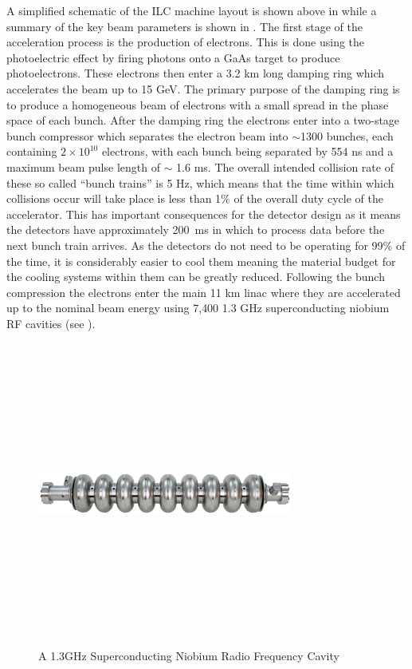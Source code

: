 A simplified schematic of the \ac{ILC} machine layout is shown above in  while a summary of the key beam parameters is shown in . The first stage of the acceleration process is the production of electrons. This is done using the photoelectric effect by firing photons onto a GaAs target to produce photoelectrons. These electrons then enter a 3.2 km long damping ring which accelerates the beam up to 15 GeV. The primary purpose of the damping ring is to produce a homogeneous beam of electrons with a small spread in the phase space of each bunch. After the damping ring the electrons enter into a two-stage bunch compressor which separates the electron beam into ${\sim}$1300 bunches, each containing ${2\times10^{10}}$ electrons, with each bunch being separated by 554 ns and a maximum beam pulse length of $\sim$ 1.6 ms. The overall intended collision rate of these so called ``bunch trains'' is 5 Hz, which means that the time within which collisions occur will take place is less than 1\% of the overall duty cycle of the accelerator. This has important consequences for the detector design as it means the detectors have approximately 200~ms in which to process data before the next bunch train arrives. As the detectors do not need to be operating for 99\% of the time, it is considerably easier to cool them meaning the material budget for the cooling systems within them can be greatly reduced. Following the bunch compression the electrons enter the main 11 km linac where they are accelerated up to the nominal beam energy using 7,400 1.3 GHz superconducting niobium \ac{RF} cavities (see ). 

\begin{figure}
  \centering
  \includegraphics[width=0.75\textwidth,height=10cm,keepaspectratio]{Experiments/fig/Cavity}
  \caption[Superconducting Cavities For The ILC]{A 1.3GHz Superconducting Niobium Radio Frequency Cavity \cite{ILCTDR}}
  \label{Fig:cavity}
\end{figure}

